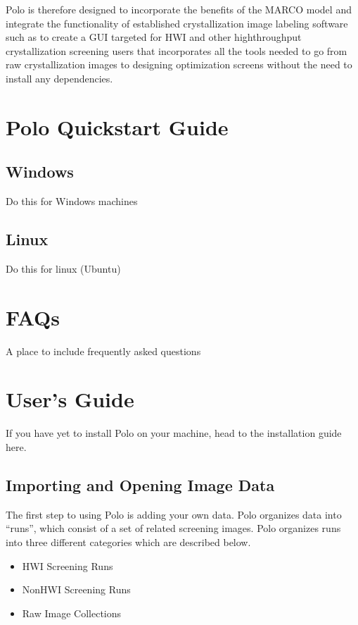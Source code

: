 \documentclass[letterpaper,10pt,english]{sphinxmanual}
\begin{document}
Polo is therefore designed to incorporate the benefits of the MARCO model
and integrate the functionality of established crystallization image
labeling software such as 
to create a GUI targeted for HWI and other high\sphinxhyphen{}throughput crystallization screening
users that incorporates all the tools needed to go from raw crystallization images
to designing optimization screens without the need to install any dependencies.


\chapter{Polo Quickstart Guide}
\label{\detokenize{Quickstart:polo-quickstart-guide}}\label{\detokenize{Quickstart::doc}}

\section{Windows}
\label{\detokenize{Quickstart:windows}}
Do this for Windows machines


\section{Linux}
\label{\detokenize{Quickstart:linux}}
Do this for linux (Ubuntu)


\chapter{FAQs}
\label{\detokenize{FAQS:faqs}}\label{\detokenize{FAQS::doc}}
A place to include frequently asked questions


\chapter{User’s Guide}
\label{\detokenize{user_guide:user-s-guide}}\label{\detokenize{user_guide::doc}}
If you have yet to install Polo on your machine, head to the installation
guide here.


\section{Importing and Opening Image Data}
\label{\detokenize{user_guide:importing-and-opening-image-data}}
The first step to using Polo is adding your own data. Polo organizes data into “runs”, which
consist of a set of related screening images. Polo organizes runs into three different
categories which are described below.
\begin{itemize}
\item {} 
HWI Screening Runs

\item {} 
Non\sphinxhyphen{}HWI Screening Runs

\item {} 
Raw Image Collections

\end{itemize}
\end{document}
